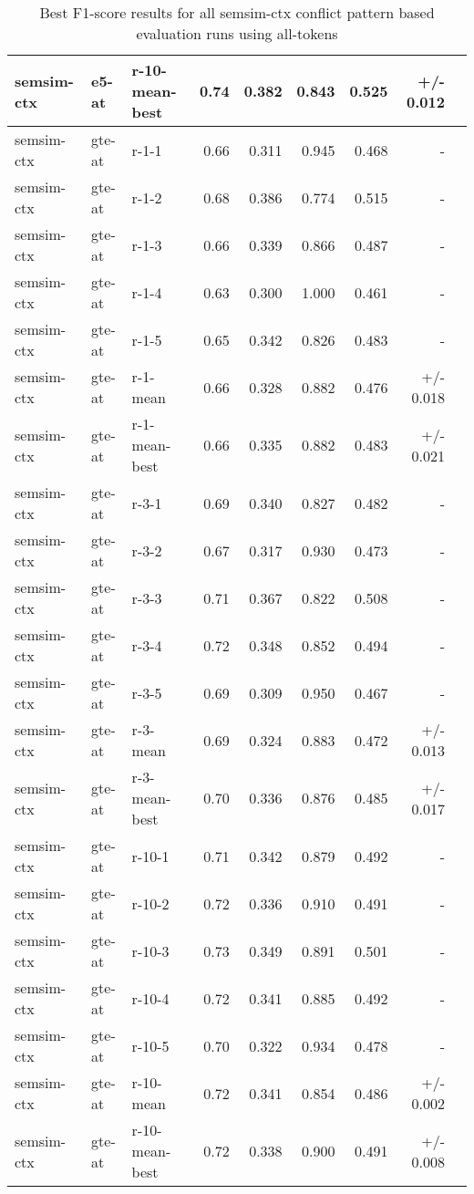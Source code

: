 \begin{table}[H]
\begin{tabular}{lllrrrrrr}
semsim-ctx & e5-at & r-10-mean-best & 0.74 & 0.382 & 0.843 & 0.525 & +/- 0.012 \\
\hline
semsim-ctx & gte-at & r-1-1 & 0.66 & 0.311 & 0.945 & 0.468 & - \\
semsim-ctx & gte-at & r-1-2 & 0.68 & 0.386 & 0.774 & 0.515 & - \\
semsim-ctx & gte-at & r-1-3 & 0.66 & 0.339 & 0.866 & 0.487 & - \\
semsim-ctx & gte-at & r-1-4 & 0.63 & 0.300 & 1.000 & 0.461 & - \\
semsim-ctx & gte-at & r-1-5 & 0.65 & 0.342 & 0.826 & 0.483 & - \\
semsim-ctx & gte-at & r-1-mean & 0.66 & 0.328 & 0.882 & 0.476 & +/- 0.018 \\
semsim-ctx & gte-at & r-1-mean-best & 0.66 & 0.335 & 0.882 & 0.483 & +/- 0.021 \\
\hline
semsim-ctx & gte-at & r-3-1 & 0.69 & 0.340 & 0.827 & 0.482 & - \\
semsim-ctx & gte-at & r-3-2 & 0.67 & 0.317 & 0.930 & 0.473 & - \\
semsim-ctx & gte-at & r-3-3 & 0.71 & 0.367 & 0.822 & 0.508 & - \\
semsim-ctx & gte-at & r-3-4 & 0.72 & 0.348 & 0.852 & 0.494 & - \\
semsim-ctx & gte-at & r-3-5 & 0.69 & 0.309 & 0.950 & 0.467 & - \\
semsim-ctx & gte-at & r-3-mean & 0.69 & 0.324 & 0.883 & 0.472 & +/- 0.013 \\
semsim-ctx & gte-at & r-3-mean-best & 0.70 & 0.336 & 0.876 & 0.485 & +/- 0.017 \\
\hline
semsim-ctx & gte-at & r-10-1 & 0.71 & 0.342 & 0.879 & 0.492 & - \\
semsim-ctx & gte-at & r-10-2 & 0.72 & 0.336 & 0.910 & 0.491 & - \\
semsim-ctx & gte-at & r-10-3 & 0.73 & 0.349 & 0.891 & 0.501 & - \\
semsim-ctx & gte-at & r-10-4 & 0.72 & 0.341 & 0.885 & 0.492 & - \\
semsim-ctx & gte-at & r-10-5 & 0.70 & 0.322 & 0.934 & 0.478 & - \\
semsim-ctx & gte-at & r-10-mean & 0.72 & 0.341 & 0.854 & 0.486 & +/- 0.002 \\
semsim-ctx & gte-at & r-10-mean-best & 0.72 & 0.338 & 0.900 & 0.491 & +/- 0.008 \\
\bottomrule
\end{tabular}
\caption{Best F1-score results for all semsim-ctx conflict pattern based evaluation runs using all-tokens}
\label{tab:quant-results-semsim-ctx-at}
\end{table}

